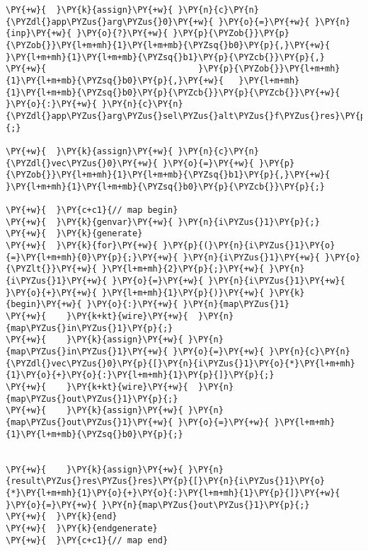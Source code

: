 {\begin{Verbatim}[commandchars=\\\{\}]
\PY{+w}{  }\PY{k}{assign}\PY{+w}{ }\PY{n}{c}\PY{n}{\PYZdl{}app\PYZus{}arg\PYZus{}0}\PY{+w}{ }\PY{o}{=}\PY{+w}{ }\PY{n}{inp}\PY{+w}{ }\PY{o}{?}\PY{+w}{ }\PY{p}{\PYZob{}}\PY{p}{\PYZob{}}\PY{l+m+mh}{1}\PY{l+m+mb}{\PYZsq{}b0}\PY{p}{,}\PY{+w}{   }\PY{l+m+mh}{1}\PY{l+m+mb}{\PYZsq{}b1}\PY{p}{\PYZcb{}}\PY{p}{,}
\PY{+w}{                              }\PY{p}{\PYZob{}}\PY{l+m+mh}{1}\PY{l+m+mb}{\PYZsq{}b0}\PY{p}{,}\PY{+w}{   }\PY{l+m+mh}{1}\PY{l+m+mb}{\PYZsq{}b0}\PY{p}{\PYZcb{}}\PY{p}{\PYZcb{}}\PY{+w}{ }\PY{o}{:}\PY{+w}{ }\PY{n}{c}\PY{n}{\PYZdl{}app\PYZus{}arg\PYZus{}sel\PYZus{}alt\PYZus{}f\PYZus{}res}\PY{p}{;}

\PY{+w}{  }\PY{k}{assign}\PY{+w}{ }\PY{n}{c}\PY{n}{\PYZdl{}vec\PYZus{}0}\PY{+w}{ }\PY{o}{=}\PY{+w}{ }\PY{p}{\PYZob{}}\PY{l+m+mh}{1}\PY{l+m+mb}{\PYZsq{}b1}\PY{p}{,}\PY{+w}{   }\PY{l+m+mh}{1}\PY{l+m+mb}{\PYZsq{}b0}\PY{p}{\PYZcb{}}\PY{p}{;}

\PY{+w}{  }\PY{c+c1}{// map begin}
\PY{+w}{  }\PY{k}{genvar}\PY{+w}{ }\PY{n}{i\PYZus{}1}\PY{p}{;}
\PY{+w}{  }\PY{k}{generate}
\PY{+w}{  }\PY{k}{for}\PY{+w}{ }\PY{p}{(}\PY{n}{i\PYZus{}1}\PY{o}{=}\PY{l+m+mh}{0}\PY{p}{;}\PY{+w}{ }\PY{n}{i\PYZus{}1}\PY{+w}{ }\PY{o}{\PYZlt{}}\PY{+w}{ }\PY{l+m+mh}{2}\PY{p}{;}\PY{+w}{ }\PY{n}{i\PYZus{}1}\PY{+w}{ }\PY{o}{=}\PY{+w}{ }\PY{n}{i\PYZus{}1}\PY{+w}{ }\PY{o}{+}\PY{+w}{ }\PY{l+m+mh}{1}\PY{p}{)}\PY{+w}{ }\PY{k}{begin}\PY{+w}{ }\PY{o}{:}\PY{+w}{ }\PY{n}{map\PYZus{}1}
\PY{+w}{    }\PY{k+kt}{wire}\PY{+w}{  }\PY{n}{map\PYZus{}in\PYZus{}1}\PY{p}{;}
\PY{+w}{    }\PY{k}{assign}\PY{+w}{ }\PY{n}{map\PYZus{}in\PYZus{}1}\PY{+w}{ }\PY{o}{=}\PY{+w}{ }\PY{n}{c}\PY{n}{\PYZdl{}vec\PYZus{}0}\PY{p}{[}\PY{n}{i\PYZus{}1}\PY{o}{*}\PY{l+m+mh}{1}\PY{o}{+}\PY{o}{:}\PY{l+m+mh}{1}\PY{p}{]}\PY{p}{;}
\PY{+w}{    }\PY{k+kt}{wire}\PY{+w}{  }\PY{n}{map\PYZus{}out\PYZus{}1}\PY{p}{;}
\PY{+w}{    }\PY{k}{assign}\PY{+w}{ }\PY{n}{map\PYZus{}out\PYZus{}1}\PY{+w}{ }\PY{o}{=}\PY{+w}{ }\PY{l+m+mh}{1}\PY{l+m+mb}{\PYZsq{}b0}\PY{p}{;}


\PY{+w}{    }\PY{k}{assign}\PY{+w}{ }\PY{n}{result\PYZus{}res\PYZus{}res}\PY{p}{[}\PY{n}{i\PYZus{}1}\PY{o}{*}\PY{l+m+mh}{1}\PY{o}{+}\PY{o}{:}\PY{l+m+mh}{1}\PY{p}{]}\PY{+w}{ }\PY{o}{=}\PY{+w}{ }\PY{n}{map\PYZus{}out\PYZus{}1}\PY{p}{;}
\PY{+w}{  }\PY{k}{end}
\PY{+w}{  }\PY{k}{endgenerate}
\PY{+w}{  }\PY{c+c1}{// map end}


\end{Verbatim}}
